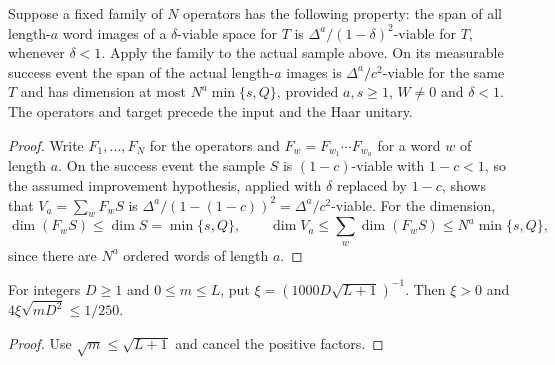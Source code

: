 \begin{lemma}
    \label{thm:sampled_operator_word_image}
    \leanok
    Suppose a fixed family of $N$ operators has the following property:
    the span of all length-$a$ word images of a $\delta$-viable space
    for $T$ is $\Delta^a/(1-\delta)^2$-viable for $T$, whenever
    $\delta<1$.
    Apply the family to the actual sample above. On its measurable
    success event the span of the actual length-$a$ images is
    $\Delta^a/c^2$-viable for the same $T$ and has dimension at most
    $N^a\min\{s,Q\}$, provided $a,s\ge1$, $W\ne0$ and $\delta<1$.
    The operators and target precede the input and the Haar unitary.
\end{lemma}
\begin{proof}\leanok
    Write $F_1,\dots,F_N$ for the operators and
    $F_w=F_{w_1}\cdots F_{w_a}$ for a word $w$ of length $a$. On the
    success event the sample $S$ is $(1-c)$-viable with $1-c<1$, so the
    assumed improvement hypothesis, applied with $\delta$ replaced by
    $1-c$, shows that $V_a=\sum_wF_wS$ is
    $\Delta^a/(1-(1-c))^2=\Delta^a/c^2$-viable. For the dimension,
    \[
        \dim(F_wS)\le\dim S=\min\{s,Q\},\qquad
        \dim V_a\le\sum_w\dim(F_wS)\le N^a\min\{s,Q\},
    \]
    since there are $N^a$ ordered words of length $a$.
\end{proof}


\begin{lemma}
    \label{lem:viable_node_trimming_radius}
    \leanok
    For integers $D\ge1$ and $0\le m\le L$, put
    $\xi=(1000D\sqrt{L+1})^{-1}$. Then $\xi>0$ and
    $4\xi\sqrt{mD^2}\le1/250$.
\end{lemma}
\begin{proof}\leanok
    Use $\sqrt{m}\le\sqrt{L+1}$ and cancel the positive factors.
\end{proof}


